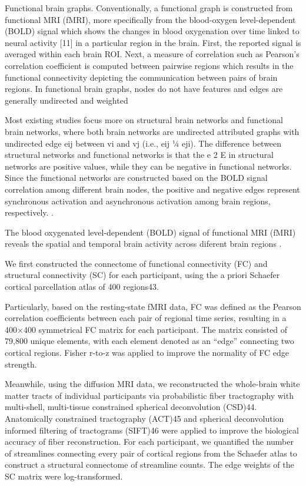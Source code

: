 Functional brain graphs. Conventionally, a functional graph is constructed from functional MRI
(fMRI), more specifically from the blood-oxygen level-dependent (BOLD) signal which shows the
changes in blood oxygenation over time linked to
neural activity [11] in a particular region in the
brain. First, the reported signal is averaged within
each brain ROI. Next, a measure of correlation such
as Pearson’s correlation coefficient is computed between pairwise regions which results in the 
functional connectivity depicting the communication between pairs of brain regions. In functional brain
graphs, nodes do not have features and edges are
generally undirected and weighted
\cite{Bessadok2022}

Most existing studies focus more on structural brain networks 
and functional brain networks, where both brain networks are 
undirected attributed graphs with undirected edge eij between 
vi and vj (i.e., eij ¼ eji). The difference between structural
networks and functional networks is that the e 2 E in structural 
networks are positive values, while they can be negative in 
functional networks.
Since the functional networks are constructed based on the BOLD 
signal correlation among different brain nodes, the positive and 
negative edges represent synchronous activation and asynchronous 
activation among brain regions, respectively. \cite{Tang2023}.

The blood oxygenated level-dependent (BOLD) signal of functional MRI
(fMRI) reveals the spatial and temporal brain activity across diferent
brain regions \cite{Zhao2022}. 

We first constructed the connectome of functional connectivity (FC) 
and structural connectivity (SC) for each participant, using the a 
priori Schaefer cortical parcellation atlas of 400 regions43. 

Particularly, based on the resting-state fMRI data, FC was defined as 
the Pearson correlation coefficients between each pair of regional 
time series, resulting in a 400×400 symmetrical FC matrix for each 
participant. The matrix consisted of 79,800 unique elements, with 
each element denoted as an “edge” connecting two cortical regions. 
Fisher r-to-z was applied to improve the normality of FC edge strength. 

Meanwhile, using the diffusion MRI data, we reconstructed the whole-brain 
white matter tracts of individual participants via probabilistic fiber 
tractography with multi-shell, multi-tissue constrained spherical 
deconvolution (CSD)44. Anatomically constrained tractography (ACT)45 and 
spherical deconvolution informed filtering of tractograms (SIFT)46 were 
applied to improve the biological accuracy of fiber reconstruction. 
For each participant, we quantified the number of streamlines connecting 
every pair of cortical regions from the Schaefer atlas to construct a 
structural connectome of streamline counts. 
The edge weights of the SC matrix were log-transformed.
\cite{Chen2024}


